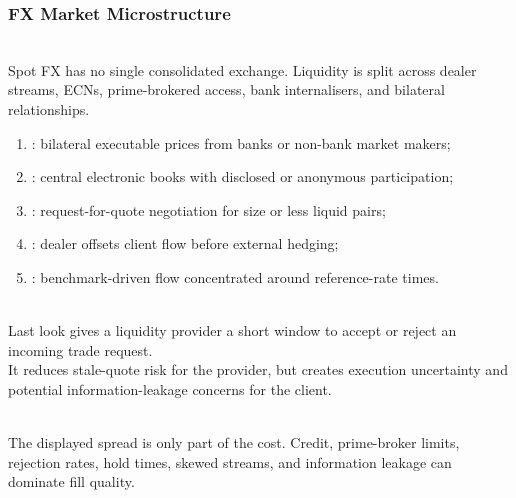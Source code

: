 \subsubsection{FX Market Microstructure}

\begin{principle} \\
Spot FX has no single consolidated exchange. Liquidity is split across dealer streams, ECNs, prime-brokered access, bank internalisers, and bilateral relationships.
\end{principle}

\begin{taxonomy} 
\begin{enumerate}[label=\roman*.]
\setlength{\itemsep}{0pt}
\item {}: bilateral executable prices from banks or non-bank market makers;
\item {}: central electronic books with disclosed or anonymous participation;
\item {}: request-for-quote negotiation for size or less liquid pairs;
\item {}: dealer offsets client flow before external hedging;
\item {}: benchmark-driven flow concentrated around reference-rate times.
\end{enumerate}
\end{taxonomy}

\begin{definition} \\
Last look gives a liquidity provider a short window to accept or reject an incoming trade request.\\
It reduces stale-quote risk for the provider, but creates execution uncertainty and potential information-leakage concerns for the client.
\end{definition}

\begin{caveat} \\
The displayed spread is only part of the cost. Credit, prime-broker limits, rejection rates, hold times, skewed streams, and information leakage can dominate fill quality.
\end{caveat}
